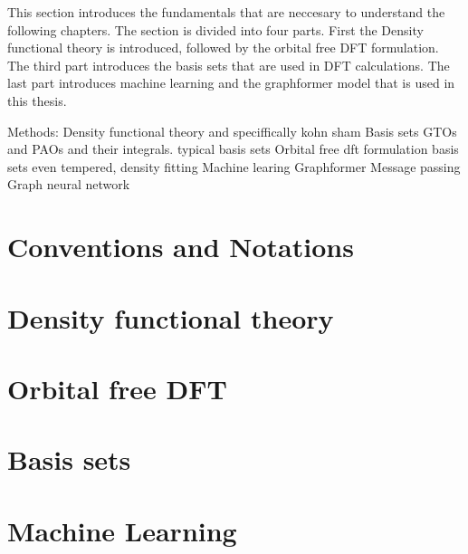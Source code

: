 This section introduces the fundamentals that are neccesary to understand the following chapters. The section is divided into four parts. First the Density functional theory is introduced, followed by the orbital free DFT formulation. The third part introduces the basis sets that are used in DFT calculations. The last part introduces machine learning and the graphformer model that is used in this thesis.




Methods:
Density functional theory and speciffically kohn sham
Basis sets GTOs and PAOs and their integrals. typical basis sets
Orbital free dft formulation basis sets even tempered, density fitting 
Machine learing
Graphformer  Message passing Graph neural network

\section{Conventions and Notations}

\section{Density functional theory}

\section{Orbital free DFT}

\section{Basis sets}

\section{Machine Learning}
